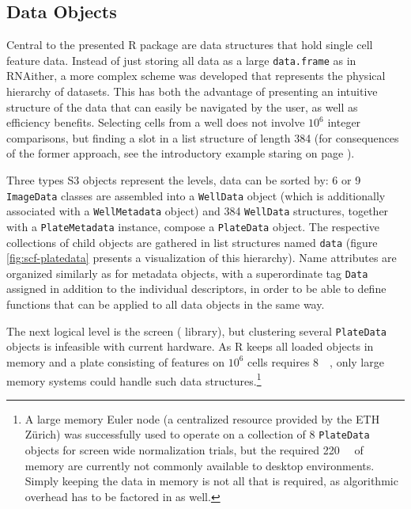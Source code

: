 \subsection{Data Objects}
Central to the presented R package are data structures that hold single cell feature data. Instead of just storing all data as a large \texttt{data.frame} as in RNAither, a more complex scheme was developed that represents the physical hierarchy of  datasets. This has both the advantage of presenting an intuitive structure of the data that can easily be navigated by the user, as well as efficiency benefits. Selecting cells from a well does not involve $10^6$ integer comparisons, but finding a slot in a list structure of length 384 (for consequences of the former approach, see the introductory example staring on page \pageref{ex:efficiency}).

Three types S3 objects represent the levels, data can be sorted by: 6 or 9 \texttt{ImageData} classes are assembled into a \texttt{WellData} object (which is additionally associated with a \texttt{WellMetadata} object) and 384 \texttt{WellData} structures, together with a \texttt{PlateMetadata} instance, compose a \texttt{PlateData} object. The respective collections of child objects are gathered in list structures named \texttt{data} (figure \ref{fig:scf-platedata} presents a visualization of this hierarchy). Name attributes are organized similarly as for metadata objects, with a superordinate tag \texttt{Data} assigned in addition to the individual descriptors, in order to be able to define functions that can be applied to all data objects in the same way.

The next logical level is the screen ( library), but clustering several \texttt{PlateData} objects is infeasible with current hardware. As R keeps all loaded objects in memory and a plate consisting of  features on \tilde$10^6$ cells requires \tilde \SI{8}{\giga\byte}, only large memory systems could handle such data structures.\footnote{A large memory Euler node (a centralized  resource provided by the ETH Z\"urich) was successfully used to operate on a collection of 8 \texttt{PlateData} objects for screen wide normalization trials, but the required \tilde \SI{220}{\giga\byte} of memory are currently not commonly available to desktop environments. Simply keeping the data in memory is not all that is required, as algorithmic overhead has to be factored in as well.}

